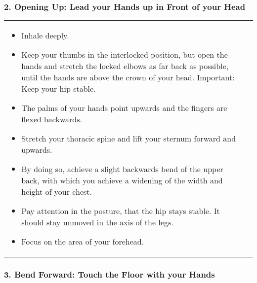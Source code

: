 \documentclass[../Book.Stress_regulation.tex]{subfiles}
\begin{document}
\subsubsection{2. Opening Up: Lead your Hands up in Front of your Head}

\begin{tabular}{p{9.7cm} p{1.8cm}}
  
\begin{itemize}
\item Inhale deeply.
\item Keep your thumbs in the interlocked position, but open the hands and stretch the locked elbows as far back as possible, until the hands are above the crown of your head. Important: Keep your hip stable.
\item The palms of your hands point upwards and the fingers are flexed backwards.
\item Stretch your thoracic spine and lift your sternum forward and upwards.
\item By doing so, achieve a slight backwards bend of the upper back, with which you achieve a widening of the width and height of your chest.
\item Pay attention in the posture, that the hip stays stable. It should stay unmoved in the axis of the legs.
\item Focus on the area of your forehead.
\end{itemize}
  &
    \raisebox{-1.2\totalheight}{\texttt{[image: SS\_Opening]}}
  
\end{tabular}
\newpage

\subsubsection{3. Bend Forward: Touch the Floor with your Hands}
\end{document}
